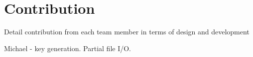 \section{Contribution}


Detail contribution from each team member in terms of design
and development

Michael - key generation. Partial file I/O.
